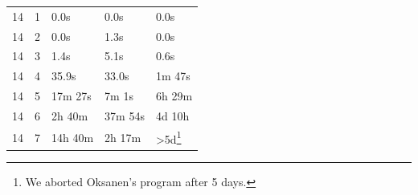 \documentclass[a4paper,UKenglish,cleveref, autoref, thm-restate, anonymous]{lipics-v2021}
\begin{document}
\begin{table}[!t]
\begin{minipage}{\linewidth}
\begin{tabular}{c|c|l|l|l}
      \hline
      14  & 1   & 0.0s             & 0.0s              & 0.0s                                                                                                                                                                                                                                                                                    \\
      14  & 2   & 0.0s             & 1.3s              & 0.0s                                                                                                                                                                                                                                                                                    \\
      14  & 3   & 1.4s             & 5.1s              & 0.6s                                                                                                                                                                                                                                                                                    \\
      14  & 4   & 35.9s            & 33.0s             & 1m 47s                                                                                                                                                                                                                                                                                  \\
      14  & 5   & 17m 27s          & 7m 1s             & 6h 29m                                                                                                                                                                                                                                                                                  \\
      14  & 6   & 2h 40m           & 37m 54s           & 4d 10h                                                                                                                                                                                                                                                                                  \\
      14  & 7   & 14h 40m          & 2h 17m            & >5d\footnote{\label{fn:oksanen_abort_appendix}We aborted Oksanen's program after 5 days.}                                                                                                                                                                                               \\

\end{tabular}
\end{minipage}
\end{table}
\end{document}
